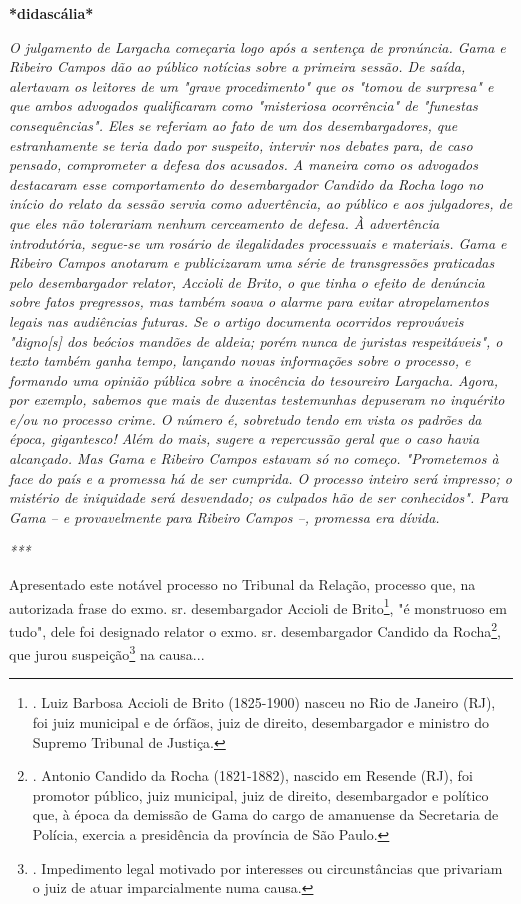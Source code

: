 \textbf{*didascália*}

\emph{O julgamento de Largacha começaria logo após a sentença de
pronúncia. Gama e Ribeiro Campos dão ao público notícias sobre a
primeira sessão. De saída, alertavam os leitores de um "grave
procedimento" que os "tomou de surpresa" e que ambos advogados
qualificaram como "misteriosa ocorrência" de "funestas consequências".
Eles se referiam ao fato de um dos desembargadores, que estranhamente se
teria dado por suspeito, intervir nos debates para, de caso pensado,
comprometer a defesa dos acusados. A maneira como os advogados
destacaram esse comportamento do desembargador Candido da Rocha logo no
início do relato da sessão servia como advertência, ao público e aos
julgadores, de que eles não tolerariam nenhum cerceamento de defesa. À
advertência introdutória, segue-se um rosário de ilegalidades
processuais e materiais. Gama e Ribeiro Campos anotaram e publicizaram
uma série de transgressões praticadas pelo desembargador relator,
Accioli de Brito, o que tinha o efeito de denúncia sobre fatos
pregressos, mas também soava o alarme para evitar atropelamentos legais
nas audiências futuras. Se o artigo documenta ocorridos reprováveis
"digno{[}s{]} dos beócios mandões de aldeia; porém nunca de juristas
respeitáveis", o texto também ganha tempo, lançando novas informações
sobre o processo, e formando uma opinião pública sobre a inocência do
tesoureiro Largacha. Agora, por exemplo, sabemos que mais de duzentas
testemunhas depuseram no inquérito e/ou no processo crime. O número é,
sobretudo tendo em vista os padrões da época, gigantesco! Além do mais,
sugere a repercussão geral que o caso havia alcançado. Mas Gama e
Ribeiro Campos estavam só no começo. "Prometemos à face do país e a
promessa há de ser cumprida. O processo inteiro será impresso; o
mistério de iniquidade será desvendado; os culpados hão de ser
conhecidos". Para Gama -- e provavelmente para Ribeiro Campos --,
promessa era dívida.}

\emph{***}

Apresentado este notável processo no Tribunal da Relação, processo que,
na autorizada frase do exmo. sr. desembargador Accioli de
Brito\footnote{. Luiz Barbosa Accioli de Brito (1825-1900) nasceu no Rio
  de Janeiro (RJ), foi juiz municipal e de órfãos, juiz de direito,
  desembargador e ministro do Supremo Tribunal de Justiça.}, "é
monstruoso em tudo", dele foi designado relator o exmo. sr.
desembargador Candido da Rocha\footnote{. Antonio Candido da Rocha
  (1821-1882), nascido em Resende (RJ), foi promotor público, juiz
  municipal, juiz de direito, desembargador e político que, à época da
  demissão de Gama do cargo de amanuense da Secretaria de Polícia,
  exercia a presidência da província de São Paulo.}, que jurou
suspeição\footnote{. Impedimento legal motivado por interesses ou
  circunstâncias que privariam o juiz de atuar imparcialmente numa
  causa.} na causa...

